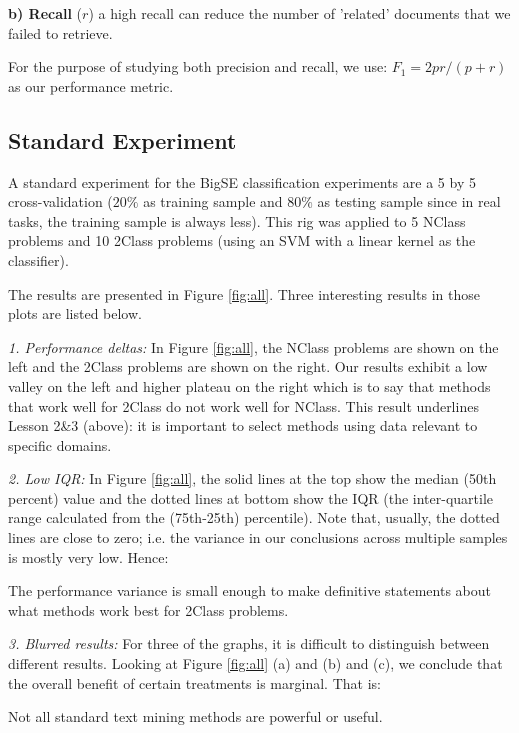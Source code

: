 \documentclass{sig-alternate-05-2015}
\theoremstyle{break}
\begin{document}
\textbf{b) Recall} ($r$) a high recall can reduce the number of 'related' documents that we failed to retrieve.

For the purpose of studying both precision and recall, we use:
 \mbox{$F_{1}=  2pr/(p+r)$}
as  our  performance metric.




\subsection{Standard Experiment}

A standard experiment for the  BigSE
classification experiments are a  5 by 5 cross-validation ($20\%$ as training sample and $80\%$ as testing sample since in real tasks, the training sample is always less). 
This rig was applied to 5 NClass problems and 10 2Class problems (using an SVM
with a linear kernel as the classifier).

The results are 
presented in  Figure \ref{fig:all}.
Three interesting results in those plots are listed below.

{\em 1. Performance deltas:}  In Figure \ref{fig:all}, the
NClass problems are shown on the left and the 2Class problems are
shown on the right.  Our results exhibit a low valley on the left and higher plateau on the right which is to say that methods that work well for 2Class
do not work well for NClass. This result underlines Lesson 2\&3 (above): it
is important to select methods using data relevant to specific domains.
 
{\em 2. Low IQR:} In  Figure \ref{fig:all},
the solid lines at the top show the median (50th percent) value
and the dotted lines at bottom show the IQR (the inter-quartile range calculated from the (75th-25th) percentile). Note that, usually, the dotted lines are close
to zero; i.e. the variance in our conclusions across multiple samples is mostly
very low. Hence:
\begin{lesson}
The performance variance is small enough to make  definitive statements about what methods work best for  2Class problems.
\end{lesson}

{\em 3. Blurred results:} For three of the graphs, it is difficult to distinguish between   different results. Looking at Figure \ref{fig:all} (a) and (b) and (c), we conclude that the overall benefit of certain treatments is marginal.
That is:
\begin{lesson}
Not all standard text mining methods are  powerful or useful.
\end{lesson}
\end{document}
